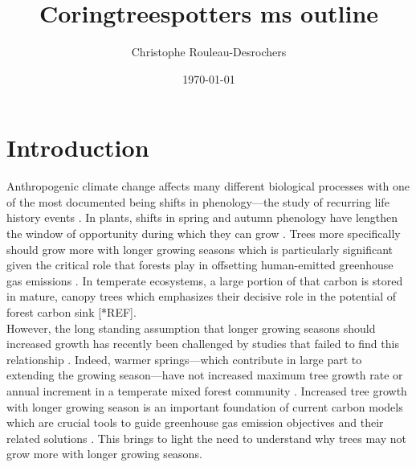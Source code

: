 \documentclass{article}\usepackage[]{graphicx}\usepackage[]{xcolor}
\begin{document}

\title{Coringtreespotters ms outline}
\author{Christophe Rouleau-Desrochers}
\date{\today}
\maketitle

\newcommand{\Arub}{\textit{A. rubrum}}
\newcommand{\Asac}{\textit{A. saccharum}}
\newcommand{\Afla}{\textit{A. flava}}
\newcommand{\Ball}{\textit{B. alleghaniensis}}
\newcommand{\Bnig}{\textit{B. nigra}}
\newcommand{\Cgla}{\textit{C. glabra}}
\newcommand{\Cova}{\textit{C. ovata}}
\newcommand{\Pdel}{\textit{P. deltoides}}
\newcommand{\Qalb}{\textit{Q. alba}}
\newcommand{\Qrub}{\textit{Q. rubra}}
\newcommand{\Tame}{\textit{T. americana}}   




\section*{Introduction}
Anthropogenic climate change affects many different biological processes with one of the most documented being shifts in phenology---the study of recurring life history events \cite{cleland_shifting_2007,menzel_european_2006,parmesan_poleward_1999}. In plants, shifts in spring and autumn phenology have lengthen the window of opportunity during which they can grow \citep{duputie_phenological_2015}. Trees more specifically should grow more with longer growing seasons which is particularly significant given the critical role that forests play in offsetting human-emitted greenhouse gas emissions \citep{keenan_net_2014, stridbeck_partly_2022,harrisGlobalMapsTwentyfirst2021}. In temperate ecosystems, a large portion of that carbon is stored in mature, canopy trees which emphasizes their decisive role in the potential of forest carbon sink [*REF]. \\

However, the long standing assumption that longer growing seasons should increased growth has recently been challenged by studies that failed to find this relationship \citep{dow_warm_2022,silvestro_longer_2023,wang_seasonal_2025,charletdesauvage_temperature_2022,cabon_crossbiome_2022}. Indeed, warmer springs---which contribute in large part to extending the growing season---have not increased maximum tree growth rate or annual increment in a temperate mixed forest community \citep{dow_warm_2022}. Increased tree growth with longer growing season is an important foundation of current carbon models which are crucial tools to guide greenhouse gas emission objectives and their related solutions \citep{friedlingstein_global_2026}. This brings to light the need to understand why trees may not grow more with longer growing seasons. \\ 
\end{document}
